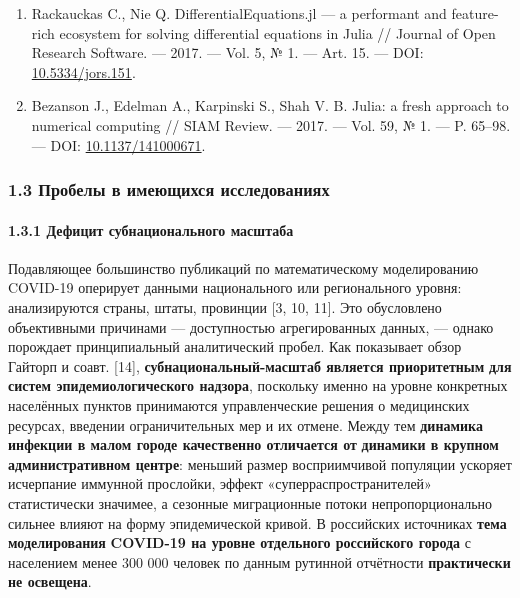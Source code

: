 \documentclass[12pt]{article}
\begin{document}
\begin{enumerate}
  Naik P. A., Yavuz M., Qureshi S. {[}et al.{]} Modeling and analysis of
  COVID-19 epidemics with treatment in fractional derivatives using real
  data from Pakistan // European Physical Journal Plus. --- 2020. ---
  Vol. 135, № 10. --- Art. 795. --- DOI:
  \href{https://doi.org/10.1140/epjp/s13360-020-00819-5}{10.1140/epjp/s13360-020-00819-5}.
\item
  Rackauckas C., Nie Q. DifferentialEquations.jl --- a performant and
  feature-rich ecosystem for solving differential equations in Julia //
  Journal of Open Research Software. --- 2017. --- Vol. 5, № 1. --- Art.
  15. --- DOI:
  \href{https://doi.org/10.5334/jors.151}{10.5334/jors.151}.
\item
  Bezanson J., Edelman A., Karpinski S., Shah V. B. Julia: a fresh
  approach to numerical computing // SIAM Review. --- 2017. --- Vol. 59,
  № 1. --- P. 65--98. --- DOI:
  \href{https://doi.org/10.1137/141000671}{10.1137/141000671}.
\end{enumerate}

\subsubsection{1.3 Пробелы в имеющихся
исследованиях}\label{ux43fux440ux43eux431ux435ux43bux44b-ux432-ux438ux43cux435ux44eux449ux438ux445ux441ux44f-ux438ux441ux441ux43bux435ux434ux43eux432ux430ux43dux438ux44fux445}

\paragraph{1.3.1 Дефицит субнационального
масштаба}\label{ux434ux435ux444ux438ux446ux438ux442-ux441ux443ux431ux43dux430ux446ux438ux43eux43dux430ux43bux44cux43dux43eux433ux43e-ux43cux430ux441ux448ux442ux430ux431ux430}

Подавляющее большинство публикаций по математическому моделированию
COVID-19 оперирует данными национального или регионального уровня:
анализируются страны, штаты, провинции {[}3, 10, 11{]}. Это обусловлено
объективными причинами --- доступностью агрегированных данных, ---
однако порождает принципиальный аналитический пробел. Как показывает
обзор Гайторп и соавт. {[}14{]}, \textbf{субнациональный-масштаб
является приоритетным} \textbf{для систем эпидемиологического надзора},
поскольку именно на уровне конкретных населённых пунктов принимаются
управленческие решения о медицинских ресурсах, введении ограничительных
мер и их отмене. Между тем \textbf{динамика инфекции в малом городе
качественно отличается от} \textbf{динамики в крупном административном
центре}: меньший размер восприимчивой популяции ускоряет исчерпание
иммунной прослойки, эффект «суперраспространителей» статистически
значимее, а сезонные миграционные потоки непропорционально сильнее
влияют на форму эпидемической кривой. В российских источниках
\textbf{тема моделирования} \textbf{COVID-19 на уровне отдельного
российского города} с населением менее 300 000 человек по данным
рутинной отчётности \textbf{практически не освещена}.
\end{document}
